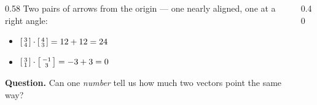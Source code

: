 \documentclass[aspectratio=169, 11pt]{beamer}
\begin{document}
\begin{frame}[t, plain]
  \begin{columns}[T]
    \begin{column}{0.58\textwidth}
      Two pairs of arrows from the origin --- one nearly aligned, one at a right angle:
      \begin{itemize}
        \item $\begin{bsmallmatrix} 3\\4 \end{bsmallmatrix}\cdot\begin{bsmallmatrix} 4\\3 \end{bsmallmatrix}=12+12=24$
        \item $\begin{bsmallmatrix} 3\\1 \end{bsmallmatrix}\cdot\begin{bsmallmatrix} -1\\3 \end{bsmallmatrix}=-3+3=0$
      \end{itemize}
      \textbf{Question.} Can one \emph{number} tell us how much two vectors point the same way?
    \end{column}
    \begin{column}{0.40\textwidth}
      \centering
    \end{column}
  \end{columns}
\end{frame}
\end{document}
